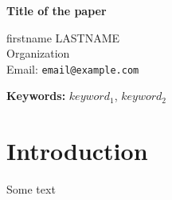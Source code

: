 \documentclass[11pt,twoside]{article}
\begin{document}
\vspace{0.2cm}

\begin{center}
{\Large\bf Title of the paper}
\end{center}

\begin{center}
{\large firstname LASTNAME}\\
Organization\\ 
Email: {\tt email@example.com}
\end{center}

\date{}

{\bf Keywords:} $keyword_1$, $keyword_2$ 
\section{Introduction}                                 

Some text \cite{yu_psi:_2017}




\newpage

\hypertarget{lastpage}{}
\end{document}
